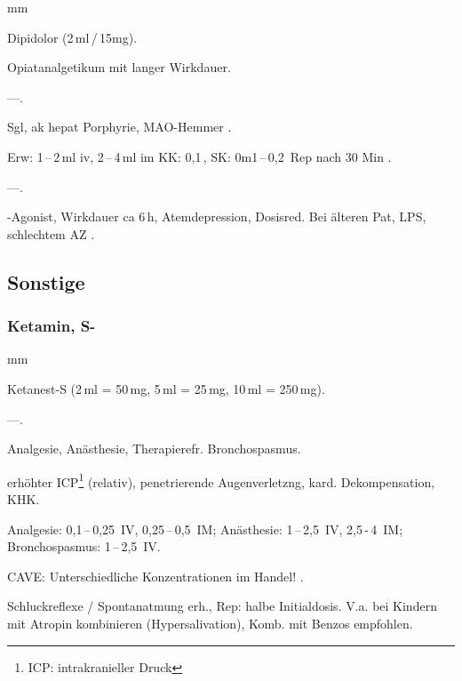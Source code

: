 \begin{labeling}[:]{mm}
  \item[Präparate]  Dipidolor (2\,ml\,/\,15mg).
  \item[Beschreibung] Opiatanalgetikum mit langer Wirkdauer.
  \item[In] ---.
  \item[KI]  Sgl, ak hepat Porphyrie, MAO-Hemmer .
  \item[Rx]  Erw: 1\,--\,2\,ml iv, 2\,--\,4\,ml im\newline
KK: 0,1\,, SK: 0m1\,--\,0,2\,\newline
Rep nach 30 Min .
  \item[Cave] ---.
  \item[Anm]  {\textmu}-Agonist, Wirkdauer ca 6\,h, Atemdepression, Dosisred.
  Bei älteren Pat, LPS, schlechtem AZ .
\end{labeling}


\subsection{Sonstige}

\subsubsection{Ketamin, S-}

\begin{labeling}[:]{mm}
  \item[Präparate]  Ketanest-S (2\,ml = 50\,mg, 5\,ml = 25\,mg, 10\,ml =
  250\,mg).
  \item[Beschreibung] ---.
  \item[In] Analgesie, Anästhesie, Therapierefr. Bronchospasmus.
  \item[KI] erhöhter ICP\footnote{ICP: intrakranieller Druck} (relativ),
  penetrierende Augenverletzng, kard. Dekompensation, KHK.
  \item[\textrecipe :]
  Analgesie: 0,1\,--\,0,25\, IV,
  0,25\,--\,0,5\, IM; Anästhesie:
  1\,--\,2,5\, IV, 2,5\,-\,4\, IM;
  Bronchospasmus: 1\,--\,2,5\, IV.
  \item[Cave] CAVE: Unterschiedliche Konzentrationen im Handel! .
  \item[Anm] Schluckreflexe / Spontanatmung erh., Rep: halbe Initialdosis.
  V.a. bei Kindern mit Atropin kombinieren (Hypersalivation), Komb. mit Benzos
  empfohlen.
\end{labeling}



